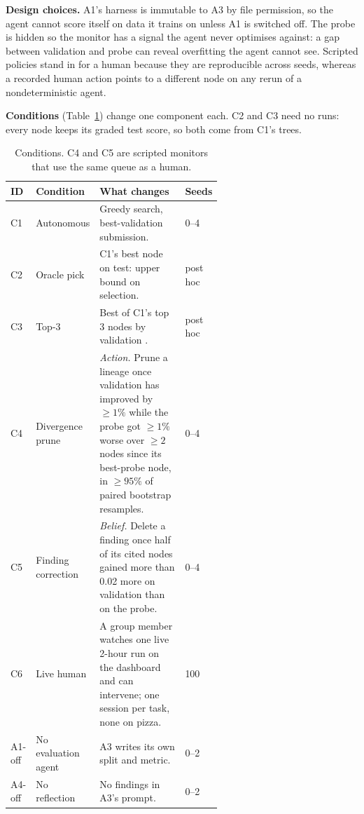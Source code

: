 \documentclass[11pt]{article}
\begin{document}
\textbf{Design choices.} A1's harness is immutable to A3 by file permission, so the agent
cannot score itself on data it trains on unless A1 is switched off. The probe is hidden
so the monitor has a signal the agent never optimises against: a gap between validation
and probe can reveal overfitting the agent cannot see. Scripted policies stand in for a
human because they are reproducible across seeds, whereas a recorded human action
points to a different node on any rerun of a nondeterministic agent.

\textbf{Conditions} (Table~\ref{tab:conditions}) change one component each. C2 and C3
need no runs: every node keeps its graded test score, so both come from C1's trees.

\begin{table}[tb]
\centering
\small
\begin{tabular}{@{}llp{0.6\linewidth}l@{}}
\toprule
\textbf{ID} & \textbf{Condition} & \textbf{What changes} & \textbf{Seeds} \\
\midrule
C1 & Autonomous & Greedy search, best-validation submission. & 0--4 \\
C2 & Oracle pick & C1's best node on test: upper bound on selection. & post hoc \\
C3 & Top-3 & Best of C1's top 3 nodes by validation \cite{aira}. & post hoc \\
C4 & Divergence prune & \emph{Action.} Prune a lineage once validation has improved
      by ${\geq}1\%$ while the probe got ${\geq}1\%$ worse over ${\geq}2$ nodes since
      its best-probe node, in ${\geq}95\%$ of paired bootstrap resamples. & 0--4 \\
C5 & Finding correction & \emph{Belief.} Delete a finding once half of its cited
      nodes gained more than 0.02 more on validation than on the probe. & 0--4 \\
C6 & Live human & A group member watches one live 2-hour run on the dashboard and can
      intervene; one session per task, none on pizza. & 100 \\
\midrule
A1-off & No evaluation agent & A3 writes its own split and metric. & 0--2 \\
A4-off & No reflection & No findings in A3's prompt. & 0--2 \\
\bottomrule
\end{tabular}
\caption{Conditions. C4 and C5 are scripted monitors that use the same queue as a
human.}
\label{tab:conditions}
\end{table}

\end{document}
